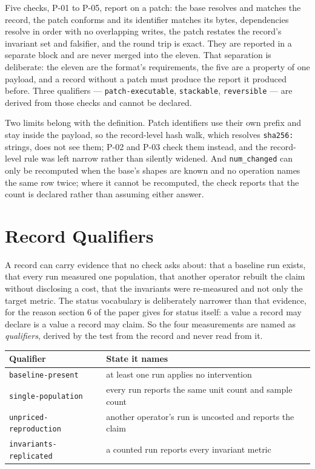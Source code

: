 \documentclass[11pt]{article}
\begin{document}
Five checks, P-01 to P-05, report on a patch: the base resolves and matches the
record, the patch conforms and its identifier matches its bytes, dependencies
resolve in order with no overlapping writes, the patch restates the record's
invariant set and falsifier, and the round trip is exact. They are reported in a
separate block and are never merged into the eleven. That separation is
deliberate: the eleven are the format's requirements, the five are a property of
one payload, and a record without a patch must produce the report it produced
before. Three qualifiers --- \texttt{patch-executable}, \texttt{stackable},
\texttt{reversible} --- are derived from those checks and cannot be declared.

Two limits belong with the definition. Patch identifiers use their own prefix
and stay inside the payload, so the record-level hash walk, which resolves
\texttt{sha256:} strings, does not see them; P-02 and P-03 check them instead,
and the record-level rule was left narrow rather than silently widened. And
\texttt{num\_changed} can only be recomputed when the base's shapes are known
and no operation names the same row twice; where it cannot be recomputed, the
check reports that the count is declared rather than assuming either answer.

\section{Record Qualifiers}

A record can carry evidence that no check asks about: that a baseline run
exists, that every run measured one population, that another operator rebuilt
the claim without disclosing a cost, that the invariants were re-measured and
not only the target metric. The status vocabulary is deliberately narrower than
that evidence, for the reason section 6 of the paper gives for status itself: a
value a record may declare is a value a record may claim. So the four
measurements are named as \emph{qualifiers}, derived by the test from the record
and never read from it.

\begin{table}[h]
\centering
\begin{tabular}{@{}ll@{}}
\toprule
Qualifier & State it names \\
\midrule
\texttt{baseline-present} & at least one run applies no intervention \\
\texttt{single-population} & every run reports the same unit count and sample count \\
\texttt{unpriced-reproduction} & another operator's run is uncosted and reports the claim \\
\texttt{invariants-replicated} & a counted run reports every invariant metric \\
\bottomrule
\end{tabular}
\end{table}
\end{document}
